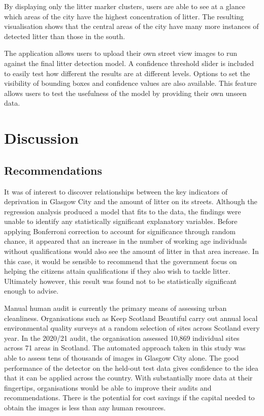 \documentclass{thesis}
\begin{document}
By displaying only the litter marker clusters, users are able to see at a glance which areas of the city have the highest concentration of litter. The resulting visualisation shows that the central areas of the city have many more instances of detected litter than those in the south.

The application allows users to upload their own street view images to run against the final litter detection model. A confidence threshold slider is included to easily test how different the results are at different levels. Options to set the visibility of bounding boxes and confidence values are also available. This feature allows users to test the usefulness of the model by providing their own unseen data.



\chapter{Discussion}

\section{Recommendations}

It was of interest to discover relationships between the key indicators of deprivation in Glasgow City and the amount of litter on its streets. Although the regression analysis produced a model that fits to the data, the findings were unable to identify any statistically significant explanatory variables. Before applying Bonferroni correction to account for significance through random chance, it appeared that an increase in the number of working age individuals without qualifications would also see the amount of litter in that area increase. In this case, it would be sensible to recommend that the government focus on helping the citizens attain qualifications if they also wish to tackle litter. Ultimately however, this result was found not to be statistically significant enough to advise.

Manual human audit is currently the primary means of assessing urban cleanliness. Organisations such as Keep Scotland Beautiful carry out annual local environmental quality surveys at a random selection of sites across Scotland every year\cite{leams}. In the 2020/21 audit, the organisation assessed 10,869 individual sites across 71 areas in Scotland. The automated approach taken in this study was able to assess tens of thousands of images in Glasgow City alone. The good performance of the detector on the held-out test data gives confidence to the idea that it can be applied across the country. With substantially more data at their fingertips, organisations would be able to improve their audits and recommendations. There is the potential for cost savings if the capital needed to obtain the images is less than any human resources.
\end{document}
